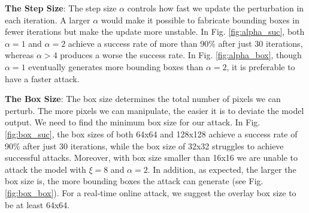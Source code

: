 \textbf{The Step Size}: The step size $\alpha$ controls how fast we update the perturbation in each iteration. A larger $\alpha$ would make it possible to fabricate bounding boxes in fewer iterations but make the update more unstable. In Fig. \ref{fig:alpha_suc}, both $\alpha=1$ and $\alpha=2$ achieve a success rate of more than 90\% after just 30 iterations, whereas $\alpha > 4$ produces a worse the success rate. In Fig. \ref{fig:alpha_box}, though $\alpha=1$ eventually generates more bounding boxes than $\alpha=2$, it is preferable to have a faster attack.

\textbf{The Box Size}: The box size determines the total number of pixels we can perturb. The more pixels we can manipulate, the easier it is to deviate the model output. We need to find the minimum box size for our attack. In Fig. \ref{fig:box_suc}, the box sizes of both 64x64 and 128x128 achieve a success rate of 90\% after just 30 iterations, while the box size of 32x32 struggles to achieve successful attacks. Moreover, with box size smaller than 16x16 we are unable to attack the model with $\xi=8$ and $\alpha=2$. In addition, as expected, the larger the box size is, the more bounding boxes the attack can generate (see Fig. \ref{fig:box_box}). For a real-time online attack, we suggest the overlay box size to be at least 64x64.

